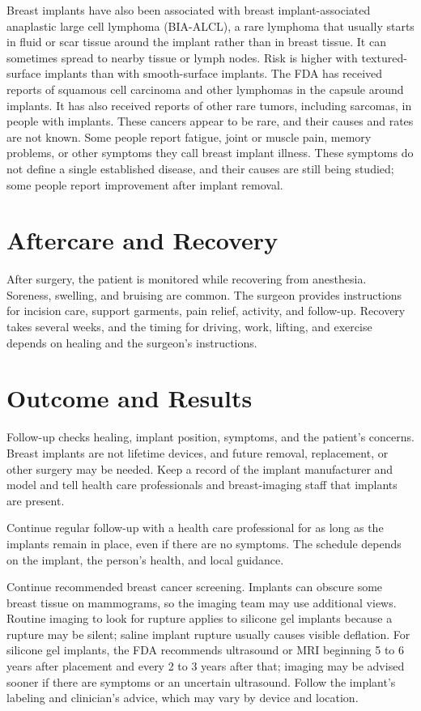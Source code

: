 Breast implants have also been associated with breast implant-associated anaplastic large cell lymphoma (BIA-ALCL), a rare lymphoma that usually starts in fluid or scar tissue around the implant rather than in breast tissue. It can sometimes spread to nearby tissue or lymph nodes. Risk is higher with textured-surface implants than with smooth-surface implants. The FDA has received reports of squamous cell carcinoma and other lymphomas in the capsule around implants. It has also received reports of other rare tumors, including sarcomas, in people with implants. These cancers appear to be rare, and their causes and rates are not known. Some people report fatigue, joint or muscle pain, memory problems, or other symptoms they call breast implant illness. These symptoms do not define a single established disease, and their causes are still being studied; some people report improvement after implant removal.

\section*{Aftercare and Recovery}
After surgery, the patient is monitored while recovering from anesthesia. Soreness, swelling, and bruising are common. The surgeon provides instructions for incision care, support garments, pain relief, activity, and follow-up. Recovery takes several weeks, and the timing for driving, work, lifting, and exercise depends on healing and the surgeon's instructions.

\section*{Outcome and Results}
Follow-up checks healing, implant position, symptoms, and the patient's concerns. Breast implants are not lifetime devices, and future removal, replacement, or other surgery may be needed. Keep a record of the implant manufacturer and model and tell health care professionals and breast-imaging staff that implants are present.

Continue regular follow-up with a health care professional for as long as the implants remain in place, even if there are no symptoms. The schedule depends on the implant, the person's health, and local guidance.

Continue recommended breast cancer screening. Implants can obscure some breast tissue on mammograms, so the imaging team may use additional views. Routine imaging to look for rupture applies to silicone gel implants because a rupture may be silent; saline implant rupture usually causes visible deflation. For silicone gel implants, the FDA recommends ultrasound or MRI beginning 5 to 6 years after placement and every 2 to 3 years after that; imaging may be advised sooner if there are symptoms or an uncertain ultrasound. Follow the implant's labeling and clinician's advice, which may vary by device and location.

